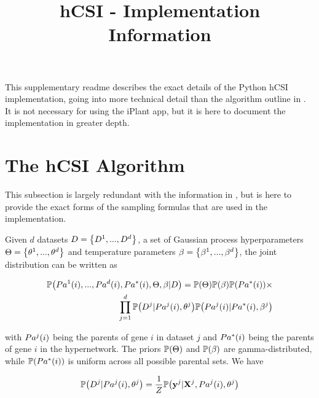 \documentclass{article}
\title{hCSI - Implementation Information}
\date{}
\let\originalleft\left
\let\originalright\right
\renewcommand{\left}{\mathopen{}\mathclose\bgroup\originalleft}
\renewcommand{\right}{\aftergroup\egroup\originalright}
\begin{document}
\maketitle

This supplementary readme describes the exact details of the Python hCSI implementation, going into more technical detail than the algorithm outline in \citet{penfold2012}. It is not necessary for using the iPlant app, but it is here to document the implementation in greater depth.

\section{The hCSI Algorithm}

This subsection is largely redundant with the information in \citet{penfold2012}, but is here to provide the exact forms of the sampling formulas that are used in the implementation.

Given $d$ datasets $D = \left\{ D^1,...,D^d \right\}$, a set of Gaussian process hyperparameters $\Theta = \left\{ \theta^1,...,\theta^d \right\}$ and temperature parameters $\beta = \left\{ \beta^1,...,\beta^d \right\}$, the joint distribution can be written as

\begin{equation}
\label{dist}
\begin{split}
\mathbb{P}\left(Pa^1\left(i\right),...,Pa^d\left(i\right),Pa^*\left(i\right),\Theta,\beta|D\right) = \mathbb{P}\left(\Theta \right)\mathbb{P}\left(\beta \right)\mathbb{P}\left(Pa^*\left(i\right)\right)\times \\
\prod_{j=1}^{d}\mathbb{P}\left(D^j|Pa^j\left(i\right),\theta ^j\right)\mathbb{P}\left(Pa^j\left(i\right)|Pa^*\left(i\right),\beta ^j\right)
\end{split}
\end{equation}

with $Pa^j\left(i\right)$ being the parents of gene $i$ in dataset $j$ and $Pa^*\left(i\right)$ being the parents of gene $i$ in the hypernetwork. The priors $\mathbb{P}\left(\Theta\right)$ and $\mathbb{P}\left(\beta\right)$ are gamma-distributed, while $\mathbb{P}\left(Pa^*\left(i\right)\right)$ is uniform across all possible parental sets. We have

\begin{equation*}
\mathbb{P}\left(D^j|Pa^j\left(i\right),\theta^j\right) = \frac{1}{Z}\mathbb{P}\left(\mathbf{y}^j|\mathbf{X}^j,Pa^j\left(i\right),\theta^j\right)
\end{equation*}
\end{document}

